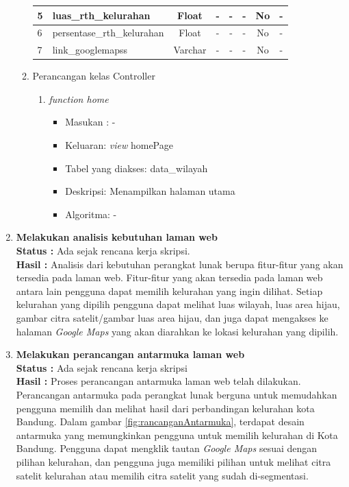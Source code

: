 \documentclass[a4paper,twoside]{article}
\begin{document}
\begin{enumerate}
\begin{enumerate}
\begin{table}[H]
{\begin{tabular}{|l|l|c|c|c|c|c|c|}
						5 & luas\_rth\_kelurahan       & Float   & -  & -   & - & No & -               \\ \hline
						6 & persentase\_rth\_kelurahan & Float   & -  & -   & - & No & -               \\ \hline
						7 & link\_googlemapss          & Varchar & -  & -   & - & No & -               \\ \hline
					\end{tabular}%
				}
			\end{table}
			\item Perancangan kelas Controller \\
			\begin{enumerate}
				\item \textit{function home}
				\begin{itemize}
					\item Masukan : -
					\item Keluaran: \textit{view} homePage
					\item Tabel yang diakses: data\_wilayah
					\item Deskripsi: Menampilkan halaman utama
					\item Algoritma: -
				\end{itemize}
			\end{enumerate}
			
		\end{enumerate}

		\item \textbf{Melakukan analisis kebutuhan laman web} \\
		{\bf Status :} Ada sejak rencana kerja skripsi.\\
		{\bf Hasil :} Analisis dari kebutuhan perangkat lunak berupa fitur-fitur yang akan tersedia pada laman web. Fitur-fitur yang akan tersedia pada laman web antara lain pengguna dapat memilih kelurahan yang ingin dilihat. Setiap kelurahan yang dipilih pengguna dapat melihat luas wilayah, luas area hijau, gambar citra satelit/gambar luas area hijau, dan juga dapat mengakses ke halaman \textit{Google Maps} yang akan diarahkan ke lokasi kelurahan yang dipilih.

		\item \textbf{ Melakukan perancangan antarmuka laman web}\\
		{\bf Status :} Ada sejak rencana kerja skripsi \\
		{\bf Hasil :} Proses perancangan antarmuka laman web telah dilakukan. Perancangan antarmuka pada perangkat lunak berguna untuk memudahkan pengguna memilih dan melihat hasil dari perbandingan kelurahan kota Bandung. Dalam gambar \ref{fig:rancanganAntarmuka}, terdapat desain antarmuka yang memungkinkan pengguna untuk memilih kelurahan di Kota Bandung. Pengguna dapat mengklik tautan \textit{Google Maps} sesuai dengan pilihan kelurahan, dan pengguna juga memiliki pilihan untuk melihat citra satelit kelurahan atau memilih citra satelit yang sudah di-segmentasi.
		

\end{enumerate}
\end{document}
